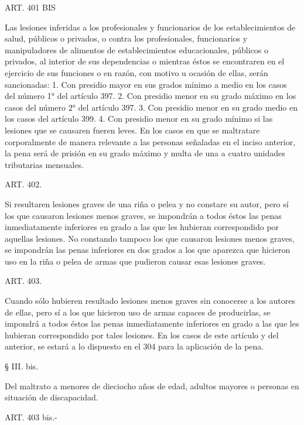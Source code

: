     ART. 401 BIS

    Las lesiones inferidas a los profesionales y funcionarios de los establecimientos de salud, públicos o privados, o contra los profesionales, funcionarios y manipuladores de alimentos de establecimientos educacionales, públicos o privados, al interior de sus dependencias o mientras éstos se encontraren en el ejercicio de sus funciones o en razón, con motivo u ocasión de ellas, serán sancionadas:
    1. Con presidio mayor en sus grados mínimo a medio en los casos del número 1° del artículo 397.
    2. Con presidio menor en su grado máximo en los casos del número 2° del artículo 397.
    3. Con presidio menor en su grado medio en los casos del artículo 399.
    4. Con presidio menor en su grado mínimo si las lesiones que se causaren fueren leves.
    En los casos en que se maltratare corporalmente de manera relevante a las personas señaladas en el inciso anterior, la pena será de prisión en su grado máximo y multa de una a cuatro unidades tributarias mensuales.



    ART. 402.

    Si resultaren lesiones graves de una riña o pelea y no constare su autor, pero sí los que causaron lesiones menos graves, se impondrán a todos éstos las penas inmediatamente inferiores en grado a las que les hubieran correspondido por aquellas lesiones.
    No constando tampoco los que causaron lesiones menos graves, se impondrán las penas inferiores en dos grados a los que aparezca que hicieron uso en la riña o pelea de armas que pudieron causar esas lesiones graves.


    ART. 403.

    Cuando sólo hubieren resultado lesiones menos graves sin conocerse a los autores de ellas, pero sí a los que hicieron uso de armas capaces de producirlas, se impondrá a todos éstos las penas inmediatamente inferiores en grado a las que les hubieran correspondido por tales lesiones.
    En los casos de este artículo y del anterior, se estará a lo dispuesto en el 304 para la aplicación de la pena.


     
    § III. bis.

    Del maltrato a menores de dieciocho años de edad, adultos mayores o personas en situación de discapacidad.




    ART. 403 bis.-

